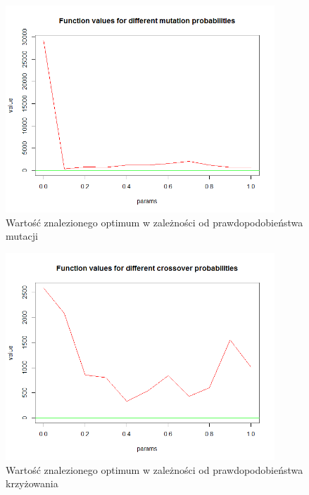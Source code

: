 \documentclass[11pt, a4paper]{article}
\begin{document}
\begin{figure}[H]
	\begin{center}
		\includegraphics[width=0.9\textwidth]{./assets/PriceTransistor2.png} %
		\caption{Wartość znalezionego optimum w zależności od prawdopodobieństwa mutacji}
		\label{fig:gulf7}
	\end{center}
\end{figure}
\begin{figure}[H]
	\begin{center}
		\includegraphics[width=0.9\textwidth]{./assets/PriceTransistor3.png} %
		\caption{Wartość znalezionego optimum w zależności od prawdopodobieństwa krzyżowania}
		\label{fig:gulf7}
	\end{center}
\end{figure}
\end{document}

